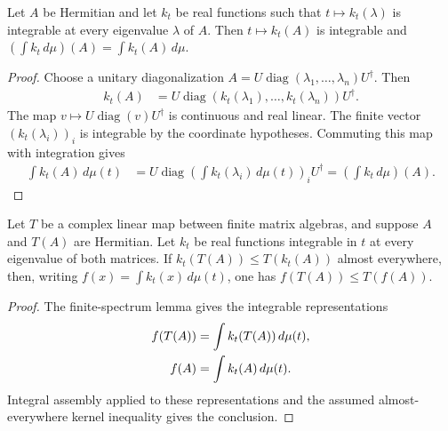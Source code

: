 \begin{lemma}
\label{lem:finite-spectrum-integral}
\leanok
Let $A$ be Hermitian and let $k_t$ be real functions such that
$t\mapsto k_t(\lambda)$ is integrable at every eigenvalue $\lambda$ of $A$.
Then $t\mapsto k_t(A)$ is integrable and
$(\int k_t\,d\mu)(A)=\int k_t(A)\,d\mu$.
\end{lemma}
\begin{proof}\leanok
Choose a unitary diagonalization
$A=U\operatorname{diag}(\lambda_1,\ldots,\lambda_n)U^\dagger$. Then
\begin{align}
 k_t(A)&=U\operatorname{diag}(k_t(\lambda_1),\ldots,k_t(\lambda_n))U^\dagger.
    \label{eq:ch06_spectral_kernel_diagonalization}
\end{align}
The map $v\mapsto U\operatorname{diag}(v)U^\dagger$ is continuous and
real linear. The finite vector $(k_t(\lambda_i))_i$ is integrable by the
coordinate hypotheses. Commuting this map with integration gives
\begin{align}
 \int k_t(A)\,d\mu(t)
 &=U\operatorname{diag}\left(\int k_t(\lambda_i)\,d\mu(t)\right)_i U^\dagger
 =\left(\int k_t\,d\mu\right)(A).
    \label{eq:ch06_finite_spectrum_integral}
\end{align}
\end{proof}

\begin{corollary}
\label{cor:scalar-spectral-integral-jensen}
\leanok
Let $T$ be a complex linear map between finite matrix algebras, and suppose
$A$ and $T(A)$ are Hermitian. Let $k_t$ be real functions integrable in $t$
at every eigenvalue of both matrices. If
$k_t(T(A))\leq T(k_t(A))$ almost everywhere, then, writing
$f(x)=\int k_t(x)\,d\mu(t)$, one has $f(T(A))\leq T(f(A))$.
\end{corollary}
\begin{proof}\leanok
{}
The finite-spectrum lemma gives the integrable representations
\begin{align}
 f(T(A))&=\int k_t(T(A))\,d\mu(t),\notag\\
 f(A)&=\int k_t(A)\,d\mu(t).
    \label{eq:ch06_scalar_spectral_representations}
\end{align}
Integral assembly applied to these representations and the assumed
almost-everywhere kernel inequality gives the conclusion.
\end{proof}


